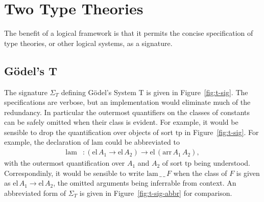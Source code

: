 \documentclass[11pt,twoside]{article}
\newcommand{\parens}[1]{(#1)}
\newcommand{\const}[1]{\text{#1}}
\newcommand{\arrclass}[2]{{#1}\to{#2}}
\newcommand{\appobj}[2]{{#1}\,{#2}}
\begin{document}
\section{Two Type Theories}

The benefit of a logical framework is that it permits the concise specification of type
theories, or other logical systems, as a signature.

\subsection{G\"odel's T}

\newcommand{\tpsort}{\const{tp}}
\newcommand{\nattp}{\const{nat}}
\newcommand{\arrtp}{\const{arr}}
\newcommand{\arrof}[2]{\appobj{\appobj{\arrtp}{#1}}{#2}}

\newcommand{\elfam}{\const{el}}
\newcommand{\elof}[1]{\appobj{\elfam}{#1}}

\newcommand{\zerocon}{\const{zero}}
\newcommand{\succcon}{\const{succ}}
\newcommand{\succof}[1]{\appobj{\succcon}{#1}}
\newcommand{\reccon}{\const{rec}}
\newcommand{\recof}[4]{\appobj{\appobj{\appobj{\appobj{\reccon}{#1}}{#2}}{#3}}{#4}}

\newcommand{\lamcon}{\const{lam}}
\newcommand{\lamof}[3]{\appobj{\appobj{\appobj{\lamcon}{#1}}{#2}}{#3}}
\newcommand{\appcon}{\const{app}}
\newcommand{\appof}[4]{\appobj{\appobj{\appobj{\appobj{\appcon}{#1}}{#2}}{#3}}{#4}}

\newcommand{\reczcon}{\const{nat-$\beta$-z}}
\newcommand{\recscon}{\const{nat-$\beta$-s}}
\newcommand{\betacon}{\const{arr-$\beta$}}
\newcommand{\etacon}{\const{arr-$\eta$}}

The signature $\Sigma_{T}$ defining G\"{o}del's System T is given in Figure~\ref{fig:t-sig}.
The specifications are verbose, but an implementation would eliminate much of the
redundancy.  In particular the outermost quantifiers on the classes of constants can be
safely omitted when their class is evident.  For example, it would be sensible to drop the
quantification over objects of sort $\tpsort$ in Figure~\ref{fig:t-sig}.  For example, the
declaration of $\lamcon$ could be abbreviated to
\begin{align*}
  \lamcon & : \arrclass{\parens{\arrclass{\elof{A_{1}}}{\elof{A_{2}}}}}{\elof{\parens{\arrof{A_{1}}{A_{2}}}}},
\end{align*}
with the outermost quantification over $A_{1}$ and $A_{2}$ of sort $\tpsort$ being
understood.  Correspondinly, it would be sensible to write $\lamof{\_{}}{\_{}}{F}$ when
the class of $F$ is given as $\arrclass{\elof{A_{1}}}{\elof{A_{2}}}$, the omitted
arguments being inferrable from context.  An abbreviated form of $\Sigma_{T}$ is given in
Figure~\ref{fig:t-sig-abbr} for comparison.
\end{document}
